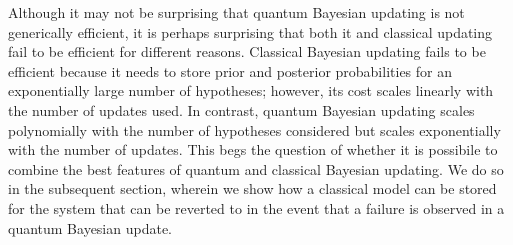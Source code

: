 \documentclass[aps,amsmath,onecolumn,amssymb]{revtex4}
\begin{document}
Although it may not be surprising that quantum Bayesian updating is not generically efficient, it is perhaps surprising that both it and classical updating fail to be efficient for different reasons.  Classical Bayesian updating fails to be efficient because it needs to store prior and posterior probabilities for an exponentially large number of hypotheses; however, its cost scales linearly with the number of updates used.  In contrast, quantum Bayesian updating scales polynomially with the number of hypotheses considered but scales exponentially with the number of updates.  This begs the question of whether it is possibile to combine the best features of quantum and classical Bayesian updating.  We do so in the subsequent section, wherein we show how a classical model can be stored for the system that can be reverted to in the event that a failure is observed in a quantum Bayesian update.



%

\end{document}

